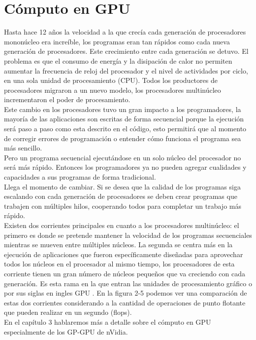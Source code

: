 \section {Cómputo en GPU}
Hasta hace 12 años la velocidad a la que crecía cada generación de procesadores mononúcleo era increíble, los programas eran tan rápidos como cada nueva generación de procesadores. Este crecimiento entre cada generación se detuvo. El problema es que el consumo de energía y la disipación de calor no permiten aumentar la frecuencia de reloj del procesador y el nivel de actividades por ciclo, en una sola unidad de procesamiento (CPU). Todos los productores de procesadores migraron a un nuevo modelo, los procesadores multinúcleo incrementaron el poder de procesamiento.\\
Este cambio en los procesadores tuvo un gran impacto a los programadores, la mayoría de las aplicaciones son escritas de forma secuencial porque la ejecución será paso a paso como esta descrito en el código, esto permitirá que al momento de corregir errores de programación o entender cómo funciona el programa sea más sencillo. \\
Pero un programa secuencial ejecutándose en un solo núcleo del procesador no será más rápido. Entonces los programadores ya no pueden agregar cualidades y capacidades a sus programas de forma tradicional.\\
Llega el momento de cambiar. Si se desea que la calidad de los programas siga escalando con cada generación de procesadores se deben crear programas que trabajen con múltiples hilos, cooperando todos para completar un trabajo más rápido.\\
Existen dos corrientes principales en cuanto a los procesadores multinúcleo: el primero es donde se pretende mantener la velocidad de los programas secuenciales mientras se mueven entre múltiples núcleos. La segunda se centra más en la ejecución de aplicaciones que fueron específicamente diseñadas para aprovechar todos los núcleos en el procesador al mismo tiempo, los procesadores de esta corriente tienen un gran número de núcleos pequeños que va creciendo con cada generación. Es esta rama en la que entran las unidades de procesamiento gráfico o por sus siglas en ingles GPU \cite{Kirk2010}. En la figura 2-5 podemos ver una comparación de estas dos corrientes considerando a la cantidad de operaciones de punto flotante que pueden realizar en un segundo (flops).\\
En el capítulo 3 hablaremos más a detalle sobre el cómputo en GPU especialmente de los GP-GPU de nVidia.\\
